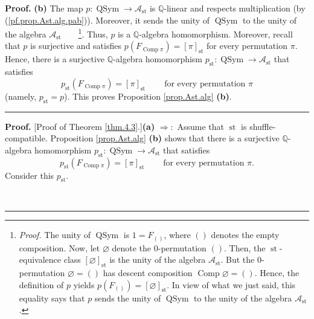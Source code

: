 \documentclass[numbers=enddot,12pt,final,onecolumn,notitlepage]{scrartcl}%
\theoremstyle{definition}
\newenvironment{proof}[1][Proof]{\noindent\textbf{#1.} }{\ \rule{0.5em}{0.5em}}
\newenvironment{verlong}{}{}
\begin{document}
\begin{verlong}
\begin{proof}
\textbf{(b)} The map $p:\operatorname*{QSym}\rightarrow\mathcal{A}%
_{\operatorname{st}}$ is $\mathbb{Q}$-linear and respects multiplication (by
(\ref{pf.prop.Ast.alg.pab})). Moreover, it sends the unity of
$\operatorname*{QSym}$ to the unity of the algebra $\mathcal{A}%
_{\operatorname{st}}$\ \ \ \ \footnote{\textit{Proof.} The unity of
$\operatorname*{QSym}$ is $1=F_{\left(  {}\right)  }$, where $\left(
{}\right)  $ denotes the empty composition. Now, let $\varnothing$ denote the
$0$-permutation $\left( \right)$.
Then, the $\operatorname{st}$-equivalence class $\left[
\varnothing\right]  _{\operatorname{st}}$ is the unity of the algebra
$\mathcal{A}_{\operatorname{st}}$. But the $0$-permutation $\varnothing
= \left( \right)$
has descent composition $\operatorname*{Comp}\varnothing=\left(  {}\right)  $.
Hence, the definition of $p$ yields $p\left(  F_{\left(  {}\right)  }\right)
=\left[  \varnothing\right]  _{\operatorname{st}}$. In view of what we just
said, this equality says that $p$ sends the unity of $\operatorname*{QSym}$ to
the unity of the algebra $\mathcal{A}_{\operatorname{st}}$.}. Thus, $p$ is a
$\mathbb{Q}$-algebra homomorphism. Moreover, recall that $p$ is surjective and
satisfies $p\left(  F_{\operatorname*{Comp}\pi}\right)  =\left[  \pi\right]
_{\operatorname{st}}$ for every permutation $\pi$. Hence, there is a
surjective $\mathbb{Q}$-algebra homomorphism
$p_{\operatorname{st}}:\operatorname*{QSym}
\rightarrow\mathcal{A}_{\operatorname{st}}$ that
satisfies
\[
p_{\operatorname{st}}\left(  F_{\operatorname*{Comp}\pi}\right)  =\left[
\pi\right]  _{\operatorname{st}}\ \ \ \ \ \ \ \ \ \ \text{for every
permutation }\pi
\]
(namely, $p_{\operatorname{st}}=p$). This proves Proposition
\ref{prop.Ast.alg} \textbf{(b)}.
\end{proof}

\begin{proof}
[Proof of Theorem \ref{thm.4.3}.]\textbf{(a)} $\Longrightarrow:$ Assume that
$\operatorname{st}$ is shuffle-compatible. Proposition \ref{prop.Ast.alg}
\textbf{(b)} shows that there is a surjective $\mathbb{Q}$-algebra
homomorphism $p_{\operatorname{st}}:\operatorname*{QSym}\rightarrow
\mathcal{A}_{\operatorname{st}}$ that satisfies
\begin{equation}
p_{\operatorname{st}}\left(  F_{\operatorname*{Comp}\pi}\right)  =\left[
\pi\right]  _{\operatorname{st}}\ \ \ \ \ \ \ \ \ \ \text{for every
permutation }\pi. \label{pf.thm.4.3.a.fwd.pst}%
\end{equation}
Consider this $p_{\operatorname{st}}$.


\end{proof}
\end{verlong}
\end{document}
